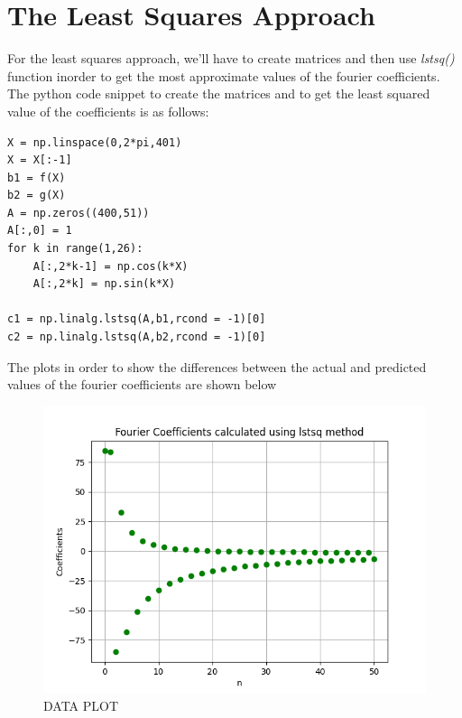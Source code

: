 \documentclass[11pt, a4paper]{article}
\begin{document}
\section{The Least Squares Approach}
For the least squares approach, we'll have to create matrices and then use \textit{lstsq()} function inorder to get the most approximate values of the fourier coefficients.\\
The python code snippet to create the matrices and to get the least squared value of the coefficients is as follows:
\begin{verbatim}	
X = np.linspace(0,2*pi,401)
X = X[:-1]
b1 = f(X)
b2 = g(X)
A = np.zeros((400,51))
A[:,0] = 1
for k in range(1,26):
    A[:,2*k-1] = np.cos(k*X)
    A[:,2*k] = np.sin(k*X)

c1 = np.linalg.lstsq(A,b1,rcond = -1)[0]
c2 = np.linalg.lstsq(A,b2,rcond = -1)[0]
\end{verbatim}
The plots in order to show the differences between the actual and predicted values of the fourier coefficients are shown below


   
   \begin{figure}[!tbh]
   	\centering
   	\includegraphics[scale=0.6]{Figure8.png}   
   	\caption{DATA PLOT}
   	\label{fig:sample}
   \end{figure} 
   
\end{document}
